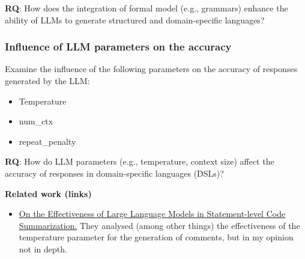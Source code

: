 \textbf{RQ}: How does the integration of formal model (e.g., grammars) enhance the ability of LLMs to generate structured and domain-specific languages?

\subsubsection{Influence of LLM parameters on the accuracy}
Examine the influence of the following parameters on the accuracy of responses generated by the LLM:

\begin{itemize}
    \item Temperature
    \item num\_ctx
    \item repeat\_penalty
\end{itemize}

\textbf{RQ}: How do LLM parameters (e.g., temperature, context size) affect the accuracy of responses in domain-specific languages (DSLs)?

\textbf{Related work (links)}
\begin{itemize}
    \item \href{https://ieeexplore.ieee.org/document/10684656}{On the Effectiveness of Large Language Models in Statement-level Code Summarization.} They analysed (among other things) the effectiveness of the temperature parameter for the generation of comments, but in my opinion not in depth.
\end{itemize}
